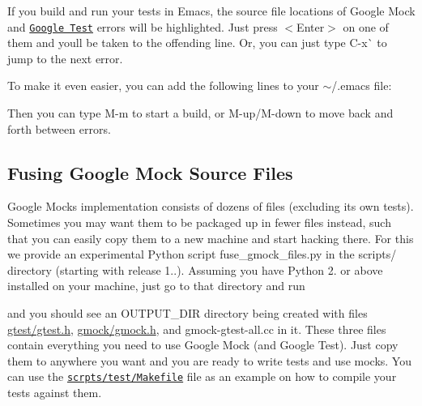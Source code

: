 If you build and run your tests in Emacs, the source file locations of Google Mock and \href{../../googletest/}{\tt Google Test} errors will be highlighted. Just press {\ttfamily $<$Enter$>$} on one of them and you\textquotesingle{}ll be taken to the offending line. Or, you can just type {\ttfamily C-\/x}\`{} to jump to the next error.

To make it even easier, you can add the following lines to your {\ttfamily $\sim$/.emacs} file\+:


\begin{DoxyCode}{0}
\end{DoxyCode}


Then you can type {\ttfamily M-\/m} to start a build, or {\ttfamily M-\/up}/{\ttfamily M-\/down} to move back and forth between errors.

\subsection*{Fusing Google Mock Source Files}

Google Mock\textquotesingle{}s implementation consists of dozens of files (excluding its own tests). Sometimes you may want them to be packaged up in fewer files instead, such that you can easily copy them to a new machine and start hacking there. For this we provide an experimental Python script {\ttfamily fuse\+\_\+gmock\+\_\+files.\+py} in the {\ttfamily scripts/} directory (starting with release 1..). Assuming you have Python 2. or above installed on your machine, just go to that directory and run 
\begin{DoxyCode}{0}
\end{DoxyCode}


and you should see an {\ttfamily O\+U\+T\+P\+U\+T\+\_\+\+D\+IR} directory being created with files {\ttfamily \mbox{\hyperlink{gtest_8h_source}{gtest/gtest.\+h}}}, {\ttfamily \mbox{\hyperlink{gmock_8h_source}{gmock/gmock.\+h}}}, and {\ttfamily gmock-\/gtest-\/all.\+cc} in it. These three files contain everything you need to use Google Mock (and Google Test). Just copy them to anywhere you want and you are ready to write tests and use mocks. You can use the \href{../scripts/test/Makefile}{\tt scrpts/test/\+Makefile} file as an example on how to compile your tests against them.

